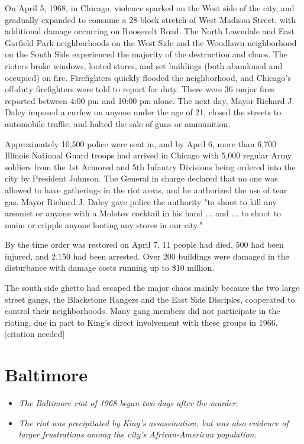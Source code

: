On April 5, 1968, in Chicago, violence sparked on the West side of the
city, and gradually expanded to consume a 28-block stretch of West
Madison Street, with additional damage occurring on Roosevelt Road. The
North Lawndale and East Garfield Park neighborhoods on the West Side and
the Woodlawn neighborhood on the South Side experienced the majority of
the destruction and chaos. The rioters broke windows, looted stores, and
set buildings (both abandoned and occupied) on fire. Firefighters
quickly flooded the neighborhood, and Chicago's off-duty firefighters
were told to report for duty. There were 36 major fires reported between
4:00 pm and 10:00 pm alone. The next day, Mayor Richard J. Daley imposed
a curfew on anyone under the age of 21, closed the streets to automobile
traffic, and halted the sale of guns or ammunition.

Approximately 10,500 police were sent in, and by April 6, more than
6,700 Illinois National Guard troops had arrived in Chicago with 5,000
regular Army soldiers from the 1st Armored and 5th Infantry Divisions
being ordered into the city by President Johnson. The General in charge
declared that no one was allowed to have gatherings in the riot areas,
and he authorized the use of tear gas. Mayor Richard J. Daley gave
police the authority "to shoot to kill any arsonist or anyone with a
Molotov cocktail in his hand ... and ... to shoot to maim or cripple
anyone looting any stores in our city."

By the time order was restored on April 7, 11 people had died, 500 had
been injured, and 2,150 had been arrested. Over 200 buildings were
damaged in the disturbance with damage costs running up to \$10 million.

The south side ghetto had escaped the major chaos mainly because the two
large street gangs, the Blackstone Rangers and the East Side Disciples,
cooperated to control their neighborhoods. Many gang members did not
participate in the rioting, due in part to King's direct involvement
with these groups in 1966.{[}citation needed{]}

\section{Baltimore}\label{baltimore}

\begin{itemize}
\item
  \emph{The Baltimore riot of 1968 began two days after the murder.}
\item
  \emph{The riot was precipitated by King's assassination, but was also
  evidence of larger frustrations among the city's African-American
  population.}
\end{itemize}

